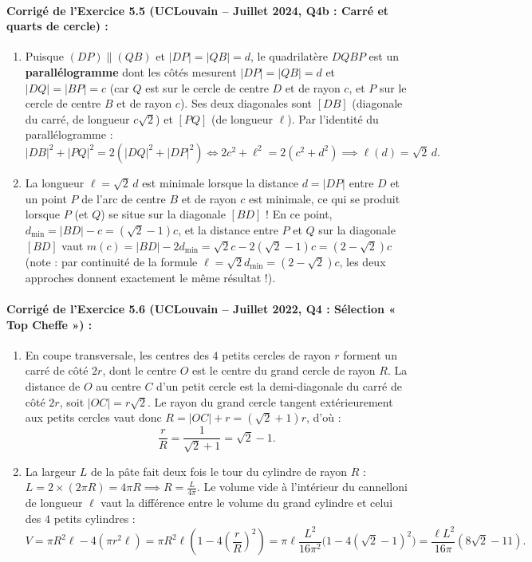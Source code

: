 \paragraph{Corrigé de l'Exercice 5.5 (UCLouvain -- Juillet 2024, Q4b : Carré et quarts de cercle) :}
\begin{enumerate}[label=(\alph*)]
    \item Puisque $(DP) \parallel (QB)$ et $|DP| = |QB| = d$, le quadrilatère $DQBP$ est un \textbf{parallélogramme} dont les côtés mesurent $|DP| = |QB| = d$ et $|DQ| = |BP| = c$ (car $Q$ est sur le cercle de centre $D$ et de rayon $c$, et $P$ sur le cercle de centre $B$ et de rayon $c$). Ses deux diagonales sont $[DB]$ (diagonale du carré, de longueur $c\sqrt{2}$) et $[PQ]$ (de longueur $\ell$). Par l'identité du parallélogramme :
    \[
        |DB|^2 + |PQ|^2 = 2(|DQ|^2 + |DP|^2) \iff 2c^2 + \ell^2 = 2(c^2 + d^2) \implies \boxed{\ell(d) = \sqrt{2}\,d}.
    \]
    \item La longueur $\ell = \sqrt{2}\,d$ est minimale lorsque la distance $d = |DP|$ entre $D$ et un point $P$ de l'arc de centre $B$ et de rayon $c$ est minimale, ce qui se produit lorsque $P$ (et $Q$) se situe sur la diagonale $[BD]$ ! En ce point, $d_{\min} = |BD| - c = (\sqrt{2}-1)c$, et la distance entre $P$ et $Q$ sur la diagonale $[BD]$ vaut $m(c) = |BD| - 2d_{\min} = \sqrt{2}c - 2(\sqrt{2}-1)c = \boxed{(2-\sqrt{2})c}$ (note : par continuité de la formule $\ell = \sqrt{2}d_{\min} = (2-\sqrt{2})c$, les deux approches donnent exactement le même résultat !).
\end{enumerate}

\paragraph{Corrigé de l'Exercice 5.6 (UCLouvain -- Juillet 2022, Q4 : Sélection « Top Cheffe ») :}
\begin{enumerate}[label=(\alph*)]
    \item En coupe transversale, les centres des $4$ petits cercles de rayon $r$ forment un carré de côté $2r$, dont le centre $O$ est le centre du grand cercle de rayon $R$. La distance de $O$ au centre $C$ d'un petit cercle est la demi-diagonale du carré de côté $2r$, soit $|OC| = r\sqrt{2}$. Le rayon du grand cercle tangent extérieurement aux petits cercles vaut donc $R = |OC| + r = (\sqrt{2}+1)r$, d'où :
    \[
        \frac{r}{R} = \frac{1}{\sqrt{2}+1} = \boxed{\sqrt{2} - 1}.
    \]
    \item La largeur $L$ de la pâte fait deux fois le tour du cylindre de rayon $R$ : $L = 2 \times (2\pi R) = 4\pi R \implies R = \frac{L}{4\pi}$. Le volume vide à l'intérieur du cannelloni de longueur $\ell$ vaut la différence entre le volume du grand cylindre et celui des $4$ petits cylindres :
    \[
        V = \pi R^2 \ell - 4(\pi r^2 \ell) = \pi R^2 \ell\left(1 - 4\left(\frac{r}{R}\right)^2\right) = \pi\ell\frac{L^2}{16\pi^2}\bigl(1 - 4(\sqrt{2}-1)^2\bigr) = \boxed{\frac{\ell L^2}{16\pi}(8\sqrt{2} - 11)}.
    \]
\end{enumerate}

